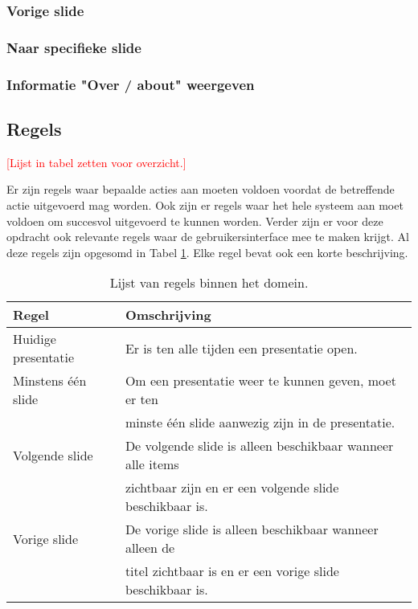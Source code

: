 \documentclass[a4paper]{article}
\newcommand{\todo}[1]{\textcolor{red}{[#1]}}
\begin{document}
\subsubsection{Vorige slide}

\subsubsection{Naar specifieke slide}

\subsubsection{Informatie "Over / about" weergeven}

\subsection{Regels}
\label{sub:regels}
\todo{Lijst in tabel zetten voor overzicht.}

Er zijn regels waar bepaalde acties aan moeten voldoen voordat de betreffende actie uitgevoerd mag worden. Ook zijn er regels waar het hele systeem aan moet voldoen om succesvol uitgevoerd te kunnen worden. Verder zijn er voor deze opdracht ook relevante regels waar de gebruikersinterface mee te maken krijgt. Al deze regels zijn opgesomd in Tabel \ref{table:regels}. Elke regel bevat ook een korte beschrijving.

\begin{table}[!h]
\centering
	\begin{tabular}{ll}
	\toprule
 	Regel & Omschrijving \\ \midrule
 	Huidige presentatie & Er is ten alle tijden een presentatie open. \\
 	Minstens \'{e}\'{e}n slide & Om een presentatie weer te kunnen geven, moet er ten \\& minste \'{e}\'{e}n slide aanwezig zijn in de presentatie.\\
 	Volgende slide & De volgende slide is alleen beschikbaar wanneer alle items \\& zichtbaar zijn en er een volgende slide beschikbaar is.\\
 	Vorige slide & De vorige slide is alleen beschikbaar wanneer alleen de \\& titel zichtbaar is en er een vorige slide beschikbaar is. \\
  	\bottomrule
	\end{tabular}
\caption{Lijst van regels binnen het domein.}
\label{table:regels}
\end{table}
\end{document}
